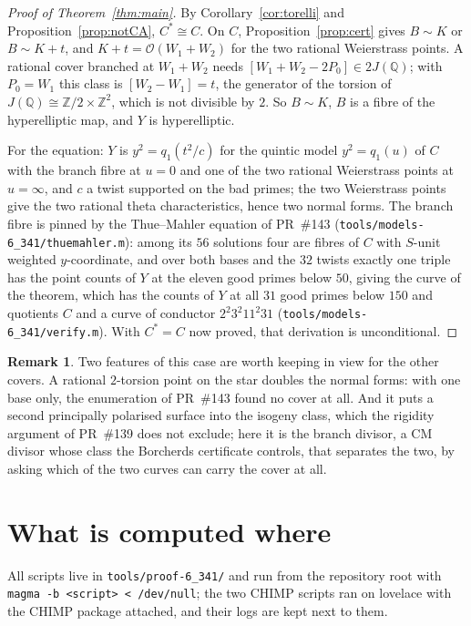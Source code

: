 \documentclass[11pt,reqno]{amsart}
\theoremstyle{plain}
\theoremstyle{definition}
\newtheorem{remark}[theorem]{Remark}
\newcommand{\Q}{\mathbb{Q}}
\newcommand{\Z}{\mathbb{Z}}
\begin{document}
\begin{proof}[Proof of Theorem~\ref{thm:main}]
By Corollary~\ref{cor:torelli} and Proposition~\ref{prop:notCA}, $C^*\cong C$. On $C$,
Proposition~\ref{prop:cert} gives $B\sim K$ or $B\sim K+t$, and $K+t=\mathcal O(W_1+W_2)$ for the
two rational Weierstrass points. A rational cover branched at $W_1+W_2$ needs $[W_1+W_2-2P_0]\in
2J(\Q)$; with $P_0=W_1$ this class is $[W_2-W_1]=t$, the generator of the torsion of
$J(\Q)\cong\Z/2\times\Z^2$, which is not divisible by $2$. So $B\sim K$, $B$ is a fibre of the
hyperelliptic map, and $Y$ is hyperelliptic.

For the equation: $Y$ is $y^2=q_1(t^2/c)$ for the quintic model $y^2=q_1(u)$ of $C$ with the branch
fibre at $u=0$ and one of the two rational Weierstrass points at $u=\infty$, and $c$ a twist
supported on the bad primes; the two Weierstrass points give the two rational theta characteristics,
hence two normal forms. The branch fibre is pinned by the Thue--Mahler equation of PR~\#143
(\texttt{tools/models-6\_341/thuemahler.m}): among its $56$ solutions four are fibres of $C$ with
$S$-unit weighted $y$-coordinate, and over both bases and the $32$ twists exactly one triple has the
point counts of $Y$ at the eleven good primes below $50$, giving the curve of the theorem, which has
the counts of $Y$ at all $31$ good primes below $150$ and quotients $C$ and a curve of conductor
$2^2 3^2 11^2 31$ (\texttt{tools/models-6\_341/verify.m}). With $C^*=C$ now proved, that
derivation is unconditional.
\end{proof}

\begin{remark}
Two features of this case are worth keeping in view for the other covers. A rational $2$-torsion
point on the star doubles the normal forms: with one base only, the enumeration of PR~\#143 found
no cover at all. And it puts a second principally polarised surface into the isogeny class, which
the rigidity argument of PR~\#139 does not exclude; here it is the branch divisor, a CM divisor
whose class the Borcherds certificate controls, that separates the two, by asking which of the two
curves can carry the cover at all.
\end{remark}

\section{What is computed where}\label{sec:scripts}

All scripts live in \texttt{tools/proof-6\_341/} and run from the repository root with
\texttt{magma -b <script> < /dev/null}; the two CHIMP scripts ran on lovelace with the CHIMP
package attached, and their logs are kept next to them.
\end{document}
